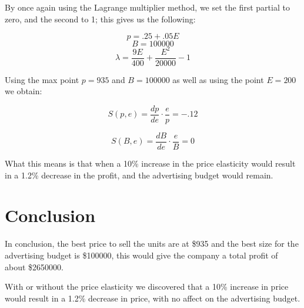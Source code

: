 \documentclass{report}
\begin{document}
By once again using the Lagrange multiplier method, we set the first partial to zero, and the second to 1; this gives us the following:

$$p = .25 +.05E$$
$$B=100000$$
$$\lambda = \dfrac{9E}{400}+\dfrac{E^2}{20000}-1$$

Using the max point $p=935$ and $B=100000$ as well as using the point $E=200$ we obtain:

$$S(p,e)=\dfrac{dp}{de}\cdot \dfrac{e}{p}=-.12$$

$$S(B,e)=\dfrac{dB}{de}\cdot \dfrac{e}{B}=0$$

What this means is that when a 10\% increase in the price elasticity would result in a 1.2\% decrease in the profit, and the advertising budget would remain.

\section{Conclusion}
In conclusion, the best price to sell the units are at \$935 and the best size for the advertising budget is \$100000, this would give the company a total profit of about \$2650000.

With or without the price elasticity we discovered that a 10\% increase in price would result in a 1.2\% decrease in price, with no affect on the advertising budget.
\end{document}

